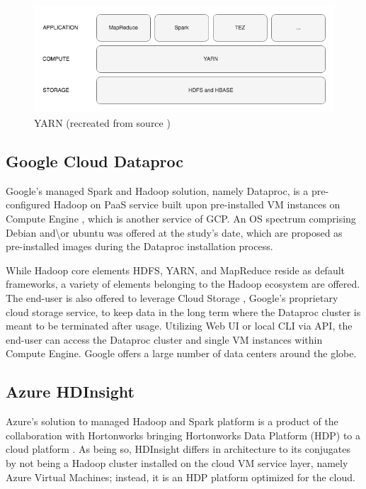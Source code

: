 \documentclass[review]{elsarticle}
\begin{document}
\begin{figure}[h!]
	\caption{YARN (recreated from source \cite{dean_mapreduce_2004})}
	\label{fig:YARNoverview}
	\includegraphics[width=\textwidth]{YARNoverview}
	\centering
\end{figure}


\subsection{Google Cloud Dataproc}\label{GCP_Dataproc}
Google's managed Spark and Hadoop solution, namely Dataproc, is a pre-configured Hadoop on PaaS service built upon pre-installed VM instances on Compute Engine \cite{noauthor_compute_nodate}, which is another service of GCP. An OS spectrum comprising Debian and\textbackslash{or} ubuntu was offered at the study's date, which are proposed as pre-installed images during the Dataproc installation process. 

While Hadoop core elements HDFS, YARN, and MapReduce reside as default frameworks, a variety of elements belonging to the Hadoop ecosystem are offered. The end-user is also offered to leverage Cloud Storage \cite{noauthor_cloud_nodate}, Google's proprietary cloud storage service, to keep data in the long term where the Dataproc cluster is meant to be terminated after usage. Utilizing Web UI or local CLI via API, the end-user can access the Dataproc cluster and single VM instances within Compute Engine. Google offers a large number of data centers around the globe.

\subsection{Azure HDInsight}\label{Azure_HDInsight}
Azure's solution to managed Hadoop and Spark platform is a product of the collaboration with Hortonworks bringing Hortonworks Data Platform (HDP) to a cloud platform \cite{noauthor_azuravail_nodate}. As being so, HDInsight differs in architecture to its conjugates by not being a Hadoop cluster installed on the cloud VM service layer, namely Azure Virtual Machines; instead, it is an HDP platform optimized for the cloud. 
\end{document}
